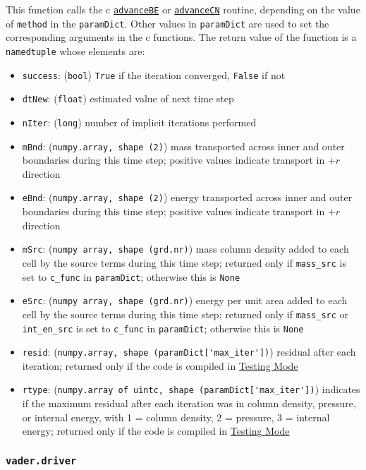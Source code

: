 \documentclass[12pt]{article}
\begin{document}
This function calls the c \hyperref[sssec:advanceBE]{\texttt{advanceBE}} or \hyperref[sssec:advanceCN]{\texttt{advanceCN}} routine, depending on the value of \verb=method= in the \verb=paramDict=. Other values in \verb=paramDict= are used to set the corresponding arguments in the c functions. The return value of the function is a \texttt{namedtuple} whose elements are:
\begin{itemize}
\item \texttt{success}: (\texttt{bool}) \verb=True= if the iteration converged, \verb=False= if not
\item \texttt{dtNew}: (\texttt{float}) estimated value of next time step
\item \texttt{nIter}: (\texttt{long}) number of implicit iterations performed
\item \texttt{mBnd}: (\texttt{numpy.array, shape (2)}) mass transported across inner and outer boundaries during this time step; positive values indicate transport in $+r$ direction
\item \texttt{eBnd}: (\texttt{numpy.array, shape (2)}) energy transported across inner and outer boundaries during this time step; positive values indicate transport in $+r$ direction
\item \texttt{mSrc}: (\texttt{numpy array, shape (grd.nr)}) mass column density added to each cell by the source terms during this time step; returned only if \verb=mass_src= is set to \verb=c_func= in \texttt{paramDict}; otherwise this is \texttt{None}
\item \texttt{eSrc}: (\texttt{numpy array, shape (grd.nr)}) energy per unit area added to each cell by the source terms during this time step; returned only if \verb=mass_src= or \verb=int_en_src= is set to \verb=c_func= in \texttt{paramDict}; otherwise this is \texttt{None}
\item \texttt{resid}: (\verb=numpy.array, shape (paramDict['max_iter'])=) residual after each iteration; returned only if the code is compiled in \hyperref[ssec:testingMode]{Testing Mode}
\item \texttt{rtype}: (\verb=numpy.array of uintc, shape (paramDict['max_iter'])=) indicates if the maximum residual after each iteration was in column density, pressure, or internal energy, with 1 = column density, 2 = pressure, 3 = internal energy;  returned only if the code is compiled in \hyperref[ssec:testingMode]{Testing Mode}
\end{itemize}

\subsubsection{\texttt{vader.driver}}
\label{sssec:vader.driver}
\end{document}
